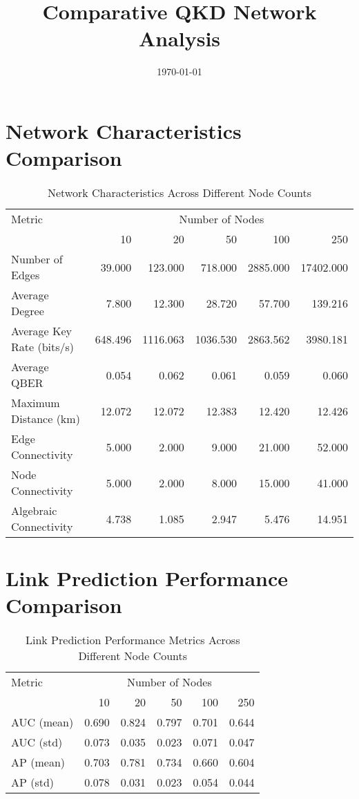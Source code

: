 \documentclass{article}
\title{Comparative QKD Network Analysis}
\date{\today}
\begin{document}
\maketitle

\section{Network Characteristics Comparison}
\begin{table}[H]
\centering
\caption{Network Characteristics Across Different Node Counts}
\begin{tabular}{lrrrrr}
\toprule
Metric & \multicolumn{5}{c}{Number of Nodes} \\
\cmidrule(lr){2-6}
& 10 & 20 & 50 & 100 & 250 \\
\midrule
Number of Edges & 39.000 & 123.000 & 718.000 & 2885.000 & 17402.000 \\
Average Degree & 7.800 & 12.300 & 28.720 & 57.700 & 139.216 \\
Average Key Rate (bits/s) & 648.496 & 1116.063 & 1036.530 & 2863.562 & 3980.181 \\
Average QBER & 0.054 & 0.062 & 0.061 & 0.059 & 0.060 \\
Maximum Distance (km) & 12.072 & 12.072 & 12.383 & 12.420 & 12.426 \\
Edge Connectivity & 5.000 & 2.000 & 9.000 & 21.000 & 52.000 \\
Node Connectivity & 5.000 & 2.000 & 8.000 & 15.000 & 41.000 \\
Algebraic Connectivity & 4.738 & 1.085 & 2.947 & 5.476 & 14.951 \\
\bottomrule
\end{tabular}
\end{table}

\section{Link Prediction Performance Comparison}
\begin{table}[H]
\centering
\caption{Link Prediction Performance Metrics Across Different Node Counts}
\begin{tabular}{lrrrrr}
\toprule
Metric & \multicolumn{5}{c}{Number of Nodes} \\
\cmidrule(lr){2-6}
& 10 & 20 & 50 & 100 & 250 \\
\midrule
AUC (mean) & 0.690 & 0.824 & 0.797 & 0.701 & 0.644 \\
AUC (std) & 0.073 & 0.035 & 0.023 & 0.071 & 0.047 \\
AP (mean) & 0.703 & 0.781 & 0.734 & 0.660 & 0.604 \\
AP (std) & 0.078 & 0.031 & 0.023 & 0.054 & 0.044 \\
\bottomrule
\end{tabular}
\end{table}
\end{document}

